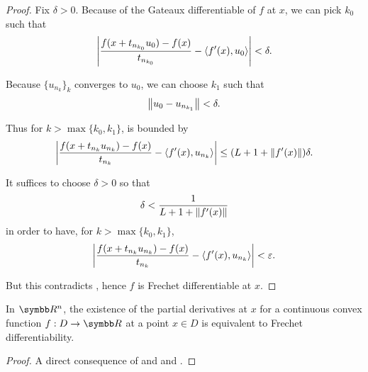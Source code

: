 \begin{proof}
  Fix \( \delta > 0 \). Because of the Gateaux differentiable of \( f \) at \( x \), we can pick \( k_0 \) such that
  \begin{equation*}
    \left\vert \frac {f(x + t_{n_{k_0}} u_0) - f(x)} {t_{n_{k_0}}} - \left\langle f'(x), u_0 \right\rangle \right\vert < \delta.
  \end{equation*}

  Because \( \{ u_{n_k} \}_k \) converges to \( u_0 \), we can choose \( k_1 \) such that
  \begin{equation*}
    \left\Vert u_0 - u_{n_{k_1}} \right\Vert < \delta.
  \end{equation*}

  Thus for \( k > \max \{ k_0, k_1 \} \),  is bounded by
  \begin{align*}
    \left\vert \frac {f(x + t_{n_k} u_{n_k}) - f(x)} {t_{n_k}} - \left\langle f'(x), u_{n_k} \right\rangle \right\vert
    \leq
    (L + 1 + \left\Vert f'(x) \right\Vert) \delta.
  \end{align*}

  It suffices to choose \( \delta > 0 \) so that
  \begin{equation*}
    \delta < \frac 1 {L + 1 + \left\Vert f'(x) \right\Vert}
  \end{equation*}
  in order to have, for \( k > \max \{ k_0, k_1 \} \),
  \begin{equation*}
    \left\vert \frac {f(x + t_{n_k} u_{n_k}) - f(x)} {t_{n_k}} - \left\langle f'(x), u_{n_k} \right\rangle \right\vert < \varepsilon.
  \end{equation*}

  But this contradicts , hence \( f \) is Frechet differentiable at \( x \).
\end{proof}

\begin{corollary}\label{thm:rn_continuous_convex_partial_derivatives_imply_frechet}
  In \( \BR^n \), the existence of the partial derivatives at \( x \) for a continuous convex function \( f: D \to \BR \) at a point \( x \in D \) is equivalent to Frechet differentiability.
\end{corollary}
\begin{proof}
  A direct consequence of and  and .
\end{proof}

